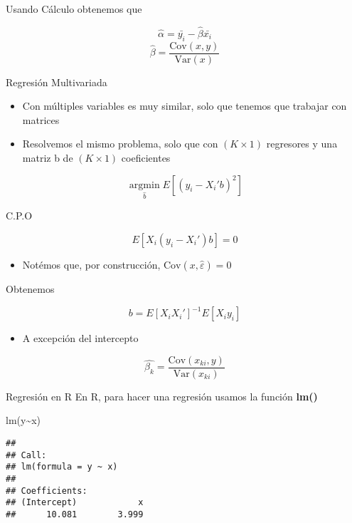 \documentclass[
  ignorenonframetext,
]{beamer}
\newenvironment{Shaded}{\begin{snugshade}}{\end{snugshade}}
\newcommand{\FunctionTok}[1]{\textcolor[rgb]{0.00,0.00,0.00}{#1}}
\newcommand{\NormalTok}[1]{#1}
\newcommand{\SpecialCharTok}[1]{\textcolor[rgb]{0.00,0.00,0.00}{#1}}
\providecommand{\tightlist}{%
  \setlength{\itemsep}{0pt}\setlength{\parskip}{0pt}}
\begin{document}
\begin{frame}{}
\protect\hypertarget{section-6}{}
Usando Cálculo obtenemos que

\[\hat{\alpha}= \bar{y_i} - \hat{\beta} \bar{x_i}\]
\[ \hat{\beta}= \frac{\text{Cov}(x,y)}{\text{Var}(x)}\]
\end{frame}

\begin{frame}{Regresión Multivariada}
\protect\hypertarget{regresiuxf3n-multivariada}{}
\begin{itemize}
\tightlist
\item
  Con múltiples variables es muy similar, solo que tenemos que trabajar
  con matrices
\item
  Resolvemos el mismo problema, solo que con \((K \times 1)\) regresores
  y una matriz b de \((K \times 1)\) coeficientes
\end{itemize}

\[\underset{\hat{b}}{\operatorname{argmin}} E[(y_i-X_i' b)^2] \]

C.P.O

\[ E[X_i(y_i-X_i')b]=0\]

\begin{itemize}
\tightlist
\item
  Notémos que, por construcción, \(\text{Cov}(x,\hat{\varepsilon})=0\)
\end{itemize}
\end{frame}

\begin{frame}{}
\protect\hypertarget{section-7}{}
Obtenemos

\[ b= E[X_iX_i']^{-1} E[X_iy_i]\]

\begin{itemize}
\tightlist
\item
  A excepción del intercepto
\end{itemize}

\[\hat{\beta_k}= \frac{\text{Cov}(x_{ki},y)}{\text{Var}(x_{ki})} \]
\end{frame}

\begin{frame}[fragile]{Regresión en R}
\protect\hypertarget{regresiuxf3n-en-r}{}
En R, para hacer una regresión usamos la función \textbf{lm()}

\begin{Shaded}
\begin{Highlighting}[]
\FunctionTok{lm}\NormalTok{(y}\SpecialCharTok{\textasciitilde{}}\NormalTok{x)}
\end{Highlighting}
\end{Shaded}

\begin{verbatim}
## 
## Call:
## lm(formula = y ~ x)
## 
## Coefficients:
## (Intercept)            x  
##      10.081        3.999
\end{verbatim}
\end{frame}
\end{document}
